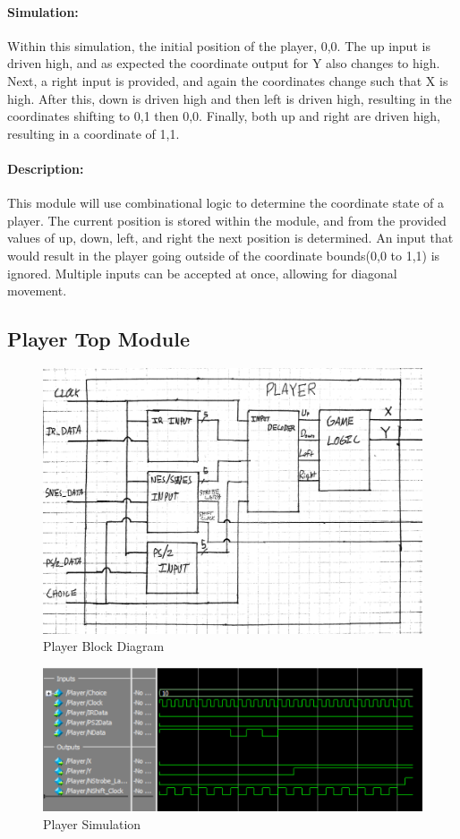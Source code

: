 \documentclass[]{article}
\begin{document}
\paragraph{Simulation:} Within this simulation, the initial position of the player, 0,0. The up input is driven high, and as expected the coordinate output for Y also changes to high. Next, a right input is provided, and again the coordinates change such that X is high. After this, down is driven high and then left is driven high, resulting in the coordinates shifting to 0,1 then 0,0. Finally, both up and right are driven high, resulting in a coordinate of 1,1.
\paragraph{Description:} This module will use combinational logic to determine the coordinate state of a player. The current position is stored within the module, and from the provided values of up, down, left, and right the next position is determined. An input that would result in the player going outside of the coordinate bounds(0,0 to 1,1) is ignored. Multiple inputs can be accepted at once, allowing for diagonal movement.

\subsection{Player Top Module}
\begin{figure}[H]\centering
    \includegraphics[width=\linewidth]{figures/Player_Block.jpg}
    \caption{Player Block Diagram}
    \label{fig:playerBlock}
\end{figure}
\begin{figure}[H]\centering
    \includegraphics[width=\linewidth]{figures/Player_Sim.png}
    \caption{Player Simulation}
    \label{fig:playerSim}
\end{figure}
\end{document}
